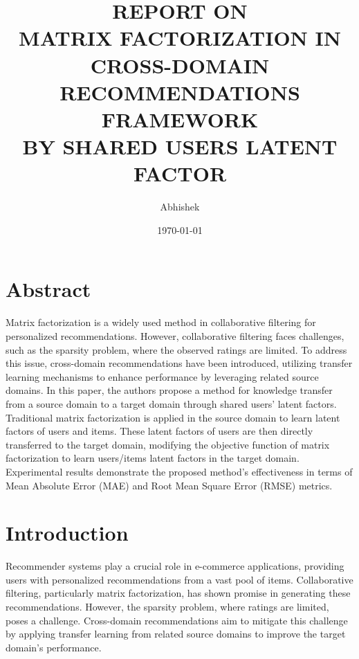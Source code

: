 \documentclass{article}
\begin{document}
\title{REPORT ON \\
MATRIX FACTORIZATION IN CROSS-DOMAIN RECOMMENDATIONS FRAMEWORK \\
BY SHARED USERS LATENT FACTOR}
\author{Abhishek}
\date{\today}

\maketitle
\section{Abstract}
Matrix factorization is a widely used method in collaborative filtering for personalized recommendations. However, collaborative filtering faces challenges, such as the sparsity problem, where the observed ratings are limited. To address this issue, cross-domain recommendations have been introduced, utilizing transfer learning mechanisms to enhance performance by leveraging related source domains. In this paper, the authors propose a method for knowledge transfer from a source domain to a target domain through shared users' latent factors. Traditional matrix factorization is applied in the source domain to learn latent factors of users and items. These latent factors of users are then directly transferred to the target domain, modifying the objective function of matrix factorization to learn users/items latent factors in the target domain. Experimental results demonstrate the proposed method's effectiveness in terms of Mean Absolute Error (MAE) and Root Mean Square Error (RMSE) metrics.


\section{Introduction}
Recommender systems play a crucial role in e-commerce applications, providing users with personalized recommendations from a vast pool of items. Collaborative filtering, particularly matrix factorization, has shown promise in generating these recommendations. However, the sparsity problem, where ratings are limited, poses a challenge. Cross-domain recommendations aim to mitigate this challenge by applying transfer learning from related source domains to improve the target domain's performance.
\end{document}
